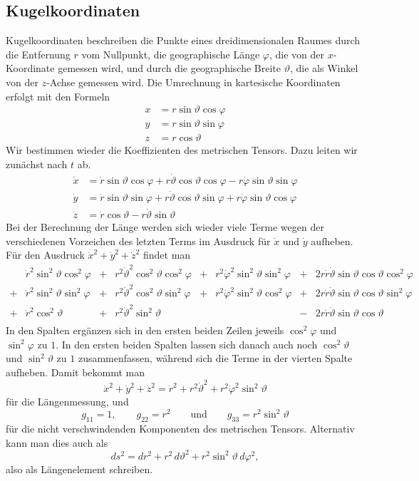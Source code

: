\subsection{Kugelkoordinaten}
Kugelkoordinaten beschreiben die Punkte eines dreidimensionalen Raumes
durch die Entfernung $r$ vom Nullpunkt, die geographische Länge
$\varphi$, die von
der $x$-Koordinate gemessen wird, und durch die geographische Breite
$\vartheta$,
die als Winkel von der $z$-Achse gemessen wird.
Die Umrechnung in kartesische Koordinaten erfolgt mit den Formeln
\begin{align*}
x&= r\sin\vartheta\cos\varphi\\
y&= r\sin\vartheta\sin\varphi\\
z&= r\cos\vartheta
\end{align*}
Wir bestimmen wieder die Koeffizienten des metrischen Tensors.
Dazu leiten wir zunächst nach $t$ ab.
\begin{align*}
\dot x
&=
\dot r\sin\vartheta\cos\varphi
+
r\dot\vartheta \cos\vartheta\cos\varphi
-
r\dot\varphi \sin\vartheta\sin\varphi
\\
\dot y
&=
\dot r\sin\vartheta\sin\varphi
+
r\dot\vartheta\cos\vartheta\sin\varphi
+
r\dot\varphi\sin\vartheta\cos\varphi
\\
\dot z
&=
\dot r\cos\vartheta
-
r\dot\vartheta \sin\vartheta
\end{align*}
Bei der Berechnung der Länge werden sich wieder viele Terme
wegen der verschiedenen Vorzeichen des letzten Terms im
Ausdruck für $\dot x$ und $\dot y$ aufheben.
Für den Ausdruck $ \dot x^2 + \dot y^2 + \dot z^2$ findet man
\[
\begin{array}{clclclcl}
 &
\dot r^2\sin^2\vartheta\cos^2\varphi
	&+&r^2\dot\vartheta^2\cos^2\vartheta\cos^2\varphi
		&+&r^2\dot\varphi^2\sin^2\vartheta\sin^2\varphi
			&+&2r\dot r\dot\vartheta\sin\vartheta\cos\vartheta\cos^2\varphi
\\
+&
\dot r^2\sin^2\vartheta\sin^2\varphi
	&+&r^2\dot\vartheta^2\cos^2\vartheta\sin^2\varphi
		&+&r^2\dot\varphi^2\sin^2\vartheta\cos^2\varphi
			&+&2r\dot r\dot\vartheta\sin\vartheta\cos\vartheta\sin^2\varphi
\\
+&
\dot r^2\cos^2\vartheta
	&+&r^2\dot\vartheta^2\sin^2\vartheta
		& &
			&-&2r\dot r\dot\vartheta \sin\vartheta \cos\vartheta
\\
\end{array}
\]
In den Spalten ergänzen sich in den ersten beiden Zeilen jeweils
$\cos^2\varphi$ und $\sin^2\varphi$ zu $1$.
In den ersten beiden Spalten lassen sich danach auch noch
$\cos^2\vartheta$ und $\sin^2\vartheta$ zu $1$ zusammenfassen,
während sich die Terme in der vierten Spalte aufheben.
Damit bekommt man
\begin{equation}
\dot x^2 + \dot y^2 + \dot z^2
=
\dot r^2+r^2\dot\vartheta^2 + r^2\dot\varphi^2\sin^2\vartheta
\label{skript:kruemmung:kugelkoordinaten}
\end{equation}
für die Längenmessung, und
\[
g_{11}=1,\qquad
g_{22}=r^2
\qquad\text{und}\qquad
g_{33}= r^2\sin^2\vartheta
\]
für die nicht verschwindenden Komponenten des metrischen Tensors.
Alternativ kann man dies auch als
\[
ds^2
=
dr^2 + r^2\,d\vartheta^2 + r^2\sin^2\vartheta\,d\varphi^2,
\]
also als Längenelement schreiben.

